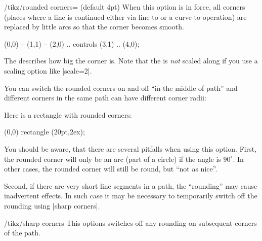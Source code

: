\begin{key}{/tikz/rounded corners= (default 4pt)}
    When this option is in force, all corners (places where a line is continued
    either via line-to or a curve-to operation) are replaced by little arcs so
    that the corner becomes smooth.
\begin{codeexample}[]
\tikz {} (0,0) -- (1,1)
           -- (2,0) .. controls (3,1) .. (4,0);
\end{codeexample}

    The  describes how big the corner is. Note that the
     is \emph{not} scaled along if you use a scaling option like
    |scale=2|.
\begin{codeexample}[]
\end{codeexample}

    You can switch the rounded corners on and off ``in the middle of path'' and
    different corners in the same path can have different corner radii:
\begin{codeexample}[]
\end{codeexample}

    Here is a rectangle with rounded corners:
\begin{codeexample}[]
\tikz \draw[rounded corners=1ex] (0,0) rectangle (20pt,2ex);
\end{codeexample}

    You should be aware, that there are several pitfalls when using this
    option. First, the rounded corner will only be an arc (part of a circle) if
    the angle is $90^\circ$. In other cases, the rounded corner will still be
    round, but ``not as nice''.

    Second, if there are very short line segments in a path, the ``rounding''
    may cause inadvertent effects. In such case it may be necessary to
    temporarily switch off the rounding using |sharp corners|.
\end{key}

\begin{key}{/tikz/sharp corners}
    This options switches off any rounding on subsequent corners of the path.
\end{key}


